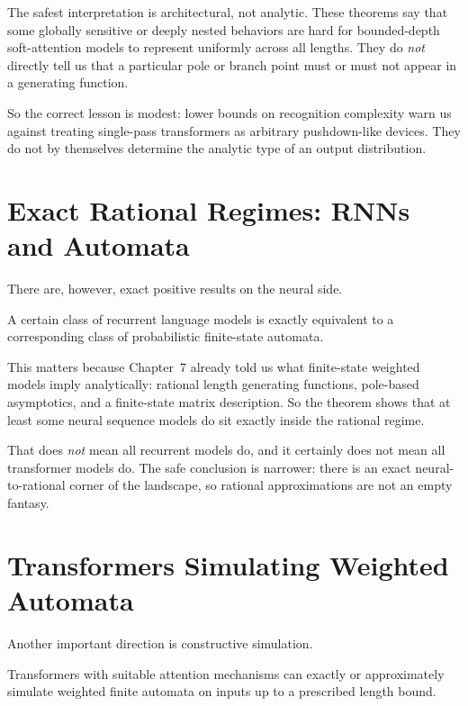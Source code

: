 The safest interpretation is architectural, not analytic. These theorems say that some globally sensitive or deeply nested behaviors are hard for bounded-depth soft-attention models to represent uniformly across all lengths. They do \emph{not} directly tell us that a particular pole or branch point must or must not appear in a generating function.

So the correct lesson is modest: lower bounds on recognition complexity warn us against treating single-pass transformers as arbitrary pushdown-like devices. They do not by themselves determine the analytic type of an output distribution.

\section[Exact Rational Regimes]{Exact Rational Regimes: RNNs and Automata}

There are, however, exact positive results on the neural side.

\begin{theorem}
A certain class of recurrent language models is exactly equivalent to a corresponding class of probabilistic finite-state automata.
\end{theorem}

This matters because Chapter~7 already told us what finite-state weighted models imply analytically: rational length generating functions, pole-based asymptotics, and a finite-state matrix description. So the theorem shows that at least some neural sequence models do sit exactly inside the rational regime.

That does \emph{not} mean all recurrent models do, and it certainly does not mean all transformer models do. The safe conclusion is narrower: there is an exact neural-to-rational corner of the landscape, so rational approximations are not an empty fantasy.

\section{Transformers Simulating Weighted Automata}

Another important direction is constructive simulation.

\begin{theorem}
Transformers with suitable attention mechanisms can exactly or approximately simulate weighted finite automata on inputs up to a prescribed length bound.
\end{theorem}

